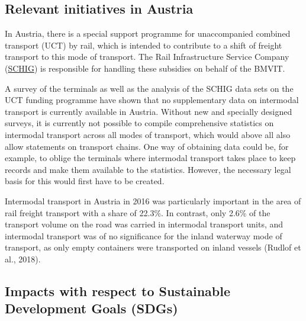 \documentclass[
]{book}
\begin{document}
\hypertarget{relevant-initiatives-in-austria-29}{%
\subsection*{Relevant initiatives in Austria}\label{relevant-initiatives-in-austria-29}}

In Austria, there is a special support programme for unaccompanied combined transport (UCT) by rail, which is intended to contribute to a shift of freight transport to this mode of transport. The Rail Infrastructure Service Company (\href{https://www.schig.com/}{SCHIG}) is responsible for handling these subsidies on behalf of the BMVIT.

A survey of the terminals as well as the analysis of the SCHIG data sets on the UCT funding programme have shown that no supplementary data on intermodal transport is currently available in Austria. Without new and specially designed surveys, it is currently not possible to compile comprehensive statistics on intermodal transport across all modes of transport, which would above all also allow statements on transport chains. One way of obtaining data could be, for example, to oblige the terminals where intermodal transport takes place to keep records and make them available to the statistics. However, the necessary legal basis for this would first have to be created.

Intermodal transport in Austria in 2016 was particularly important in the area of rail freight transport with a share of 22.3\%. In contrast, only 2.6\% of the transport volume on the road was carried in intermodal transport units, and intermodal transport was of no significance for the inland waterway mode of transport, as only empty containers were transported on inland vessels (Rudlof et al., 2018).

\hypertarget{impacts-with-respect-to-sustainable-development-goals-sdgs-29}{%
\subsection*{Impacts with respect to Sustainable Development Goals (SDGs)}\label{impacts-with-respect-to-sustainable-development-goals-sdgs-29}}
\end{document}
